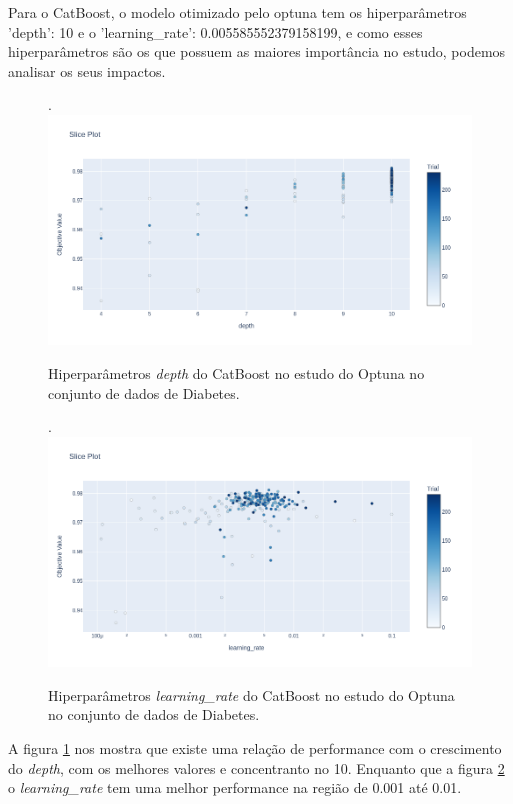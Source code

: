Para o CatBoost, o modelo otimizado pelo optuna tem os hiperparâmetros 'depth': 10 e o 'learning\_rate': 0.005585552379158199, e como esses hiperparâmetros são os que possuem as maiores importância no estudo, podemos analisar os seus impactos. 
\begin{figure}[H]
 \caption{Hiperparâmetros \textit{depth} do CatBoost no estudo do Optuna no conjunto de dados de Diabetes.}.
 \label{fig:op:dia:dep:cat}
 \centering
 \includegraphics[scale=0.3]{images/optuna_cat_depth_dia.png}
\end{figure}
\begin{figure}[H]
 \caption{Hiperparâmetros \textit{learning\_rate} do CatBoost no estudo do Optuna no conjunto de dados de Diabetes.}.
 \label{fig:op:dia:len:cat}
 \centering
 \includegraphics[scale=0.3]{images/optuna_cat_learnig_dia.png}
\end{figure}
A figura \ref{fig:op:dia:dep:cat} nos mostra que existe uma relação de performance com o crescimento do \textit{depth}, com os melhores valores e concentranto no 10. Enquanto que a figura \ref{fig:op:dia:len:cat} o \textit{learning\_rate} tem uma melhor performance na região de 0.001 até 0.01.



